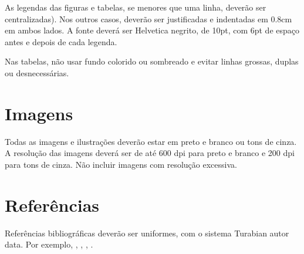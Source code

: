 \documentclass[12pt]{article}
\begin{document}
As legendas das figuras e tabelas, se menores que uma linha, deverão
ser centralizadas). Nos outros casos, deverão ser justificadas e
indentadas em 0.8cm em ambos lados. A fonte deverá ser Helvetica
negrito, de 10pt, com 6pt de espaço antes e depois de cada legenda.

Nas tabelas, não usar fundo colorido ou sombreado e evitar linhas
grossas, duplas ou desnecessárias.


\section{Imagens}

Todas as imagens e ilustrações deverão estar em preto e branco ou tons
de cinza. A resolução das imagens deverá ser de até 600 dpi para preto
e branco e 200 dpi para tons de cinza. Não incluir imagens com
resolução excessiva.

\section{Referências}

Referências bibliográficas deverão ser uniformes, com o sistema
Turabian autor data. Por exemplo, \cite{kroger04:desenvolvendo},
\cite{babbitt61:set}, \cite{coutinho.ea05:computational},
\cite{morris87:composition}.


\end{document}
